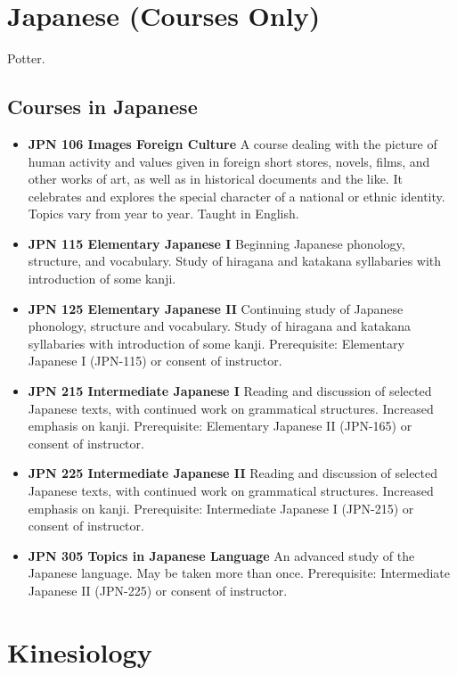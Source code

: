 \documentclass[
  letterpaper,
]{scrbook}
\providecommand{\tightlist}{%
  \setlength{\itemsep}{0pt}\setlength{\parskip}{0pt}}
\begin{document}
\section{Japanese (Courses Only)}\label{sec-japanese}

Potter.

\subsection{Courses in Japanese}\label{courses-in-japanese}

\begin{itemize}
\tightlist
\item
  \textbf{JPN 106 Images Foreign Culture} A course dealing with the
  picture of human activity and values given in foreign short stores,
  novels, films, and other works of art, as well as in historical
  documents and the like. It celebrates and explores the special
  character of a national or ethnic identity. Topics vary from year to
  year. Taught in English.
\item
  \textbf{JPN 115 Elementary Japanese I} Beginning Japanese phonology,
  structure, and vocabulary. Study of hiragana and katakana syllabaries
  with introduction of some kanji.
\item
  \textbf{JPN 125 Elementary Japanese II} Continuing study of Japanese
  phonology, structure and vocabulary. Study of hiragana and katakana
  syllabaries with introduction of some kanji. Prerequisite: Elementary
  Japanese I (JPN-115) or consent of instructor.
\item
  \textbf{JPN 215 Intermediate Japanese I} Reading and discussion of
  selected Japanese texts, with continued work on grammatical
  structures. Increased emphasis on kanji. Prerequisite: Elementary
  Japanese II (JPN-165) or consent of instructor.
\item
  \textbf{JPN 225 Intermediate Japanese II} Reading and discussion of
  selected Japanese texts, with continued work on grammatical
  structures. Increased emphasis on kanji. Prerequisite: Intermediate
  Japanese I (JPN-215) or consent of instructor.
\item
  \textbf{JPN 305 Topics in Japanese Language} An advanced study of the
  Japanese language. May be taken more than once. Prerequisite:
  Intermediate Japanese II (JPN-225) or consent of instructor.
\end{itemize}

\section{Kinesiology}\label{sec-kinesiology}
\end{document}
